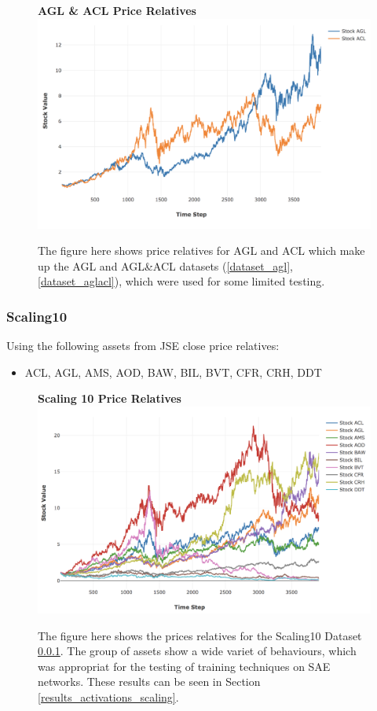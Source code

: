 \documentclass[a4paper,11pt,oneside]{article}
\theoremstyle{plain}
\theoremstyle{definition}
\begin{document}
	\begin{figure}[H]
		\centering
		\textbf{AGL \& ACL Price Relatives}
		\includegraphics[scale=0.45]{images/results/prices/aglacl_prices.png} 
		\caption[AGL \& ACL Price Relatives]{The figure here shows price relatives for AGL and ACL which make up the AGL and AGL\&ACL datasets (\ref{dataset_agl}, \ref{dataset_aglacl}), which were used for some limited testing.}
		\label{figure-aglacl_prices}
	\end{figure}
	
	
	\subsubsection{Scaling10}\label{dataset_scaling10}
	
	Using the following assets from JSE close price relatives:
	
	\begin{itemize}
		\item ACL, AGL, AMS, AOD, BAW, BIL, BVT, CFR, CRH, DDT
	\end{itemize}
	
	\begin{figure}[H]
		\centering
		\textbf{Scaling 10 Price Relatives}
		\includegraphics[scale=0.45]{images/results/prices/scaling10_prices.png} 
		\caption[Scaling 10 Price Relatives]{The figure here shows the prices relatives for the Scaling10 Dataset \ref{dataset_scaling10}. The group of assets show a wide variet of behaviours, which was appropriat for the testing of training techniques on SAE networks. These results can be seen in Section \ref{results_activations_scaling}.}
		\label{figure-scaling0_prices}
	\end{figure}
	
\end{document}
